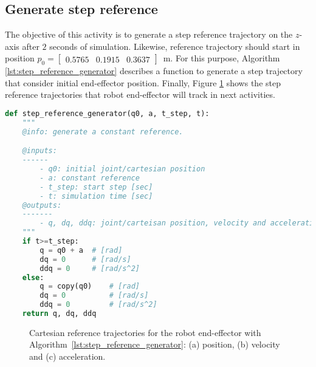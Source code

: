 \graphicspath{{images/act_1.2/}}
\subsection{Generate step reference}
\label{subsec:generate_step_reference}
The objective of this activity is to generate a step reference trajectory on the $z$-axis after $2$ seconds of simulation. Likewise, reference trajectory should start in position $p_0=\begin{bmatrix}  0.5765 &   0.1915 &   0.3637 \end{bmatrix}$~m. For this purpose, Algorithm \ref{lst:step_reference_generator} describes a function to generate a step trajectory that consider initial end-effector position. Finally, Figure \ref{fig:act_1.2_step_reference} shows the step reference trajectories that robot end-effector will track in next activities. \vspace{.5cm}

\begin{lstlisting}[language=Python,caption=Function to generate a step reference trajectory., label={lst:step_reference_generator}]
def step_reference_generator(q0, a, t_step, t):
    """
    @info: generate a constant reference.

    @inputs:
    ------
        - q0: initial joint/cartesian position
        - a: constant reference
        - t_step: start step [sec]
        - t: simulation time [sec]
    @outputs:
    -------
        - q, dq, ddq: joint/carteisan position, velocity and acceleration
    """
    if t>=t_step:
        q = q0 + a  # [rad]
        dq = 0      # [rad/s]
        ddq = 0     # [rad/s^2]
    else:
        q = copy(q0)    # [rad]
        dq = 0          # [rad/s]
        ddq = 0         # [rad/s^2]            
    return q, dq, ddq
\end{lstlisting}

\vspace*{0cm}
\begin{figure}
	\centering
	\hfill
	\hfill
	\caption{Cartesian reference trajectories for the robot end-effector with Algorithm~\ref{lst:step_reference_generator}: (a) position, (b) velocity and (c) acceleration.}
	\label{fig:act_1.2_step_reference}
\end{figure}
